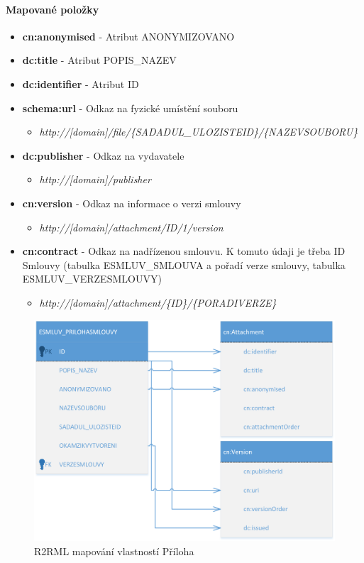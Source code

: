 \paragraph*{Mapované položky}
\begin{itemize}
\item \textbf{cn:anonymised} - Atribut ANONYMIZOVANO
\item \textbf{dc:title} - Atribut POPIS\_NAZEV
\item \textbf{dc:identifier} - Atribut ID
\item \textbf{schema:url} - Odkaz na fyzické umístění souboru
	\begin{itemize}
	\item \textit{http://[domain]/file/\{SADADUL\_ULOZISTEID\}/\{NAZEVSOUBORU\}}
	\end{itemize}
\item \textbf{dc:publisher} - Odkaz na vydavatele
	\begin{itemize}
	\item \textit{http://[domain]/publisher}
	\end{itemize}
\item \textbf{cn:version} - Odkaz na informace o verzi smlouvy
	\begin{itemize}
	\item \textit{http://[domain]/attachment/{ID}/1/version}
	\end{itemize}
\item \textbf{cn:contract} - Odkaz na nadřízenou smlouvu. K tomuto údaji je třeba ID Smlouvy (tabulka ESMLUV\_SMLOUVA a pořadí verze smlouvy, tabulka ESMLUV\_VERZESMLOUVY)
	\begin{itemize}
	\item \textit{http://[domain]/attachment/\{ID\}/\{PORADIVERZE\}}
	\end{itemize}
\end{itemize}

\begin{figure}[H]
\centerline{\includegraphics[width=\textwidth]{img/mapAttachment.eps}}
\caption{R2RML mapování vlastností Příloha}
\label{obr:mapAttachment}
\end{figure}

